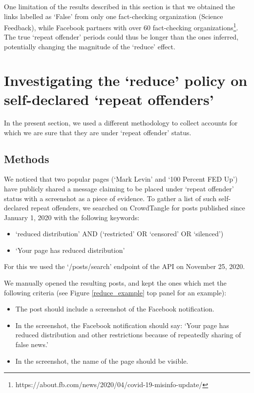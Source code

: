 \documentclass[11pt,a4paper]{article}
\begin{document}
One limitation of the results described in this section is that we obtained the links labelled as `False' from only one fact-checking organization (Science Feedback), while Facebook partners with over 60 fact-checking organizations\footnote{https://about.fb.com/news/2020/04/covid-19-misinfo-update/}.
The true `repeat offender' periods could thus be longer than the ones inferred, potentially changing the magnitude of the ‘reduce’ effect.

\section{Investigating the `reduce' policy on self-declared `repeat offenders'}

In the present section, we used a different methodology to collect accounts for which we are sure that they are under `repeat offender' status. 

\subsection{Methods}

We noticed that two popular pages (`Mark Levin' and `100 Percent FED Up') have publicly shared a message claiming to be placed under `repeat offender' status with a screenshot as a piece of evidence.
To gather a list of such self-declared repeat offenders, we searched on CrowdTangle for posts published since January 1, 2020 with the following keywords:
\begin{itemize}
\item `reduced distribution' AND (`restricted' OR `censored' OR `silenced')
\item `Your page has reduced distribution'
\end{itemize}
For this we used the `/posts/search' endpoint of the API on November 25, 2020. 

We manually opened the resulting posts, and kept the ones which met the following criteria (see Figure \ref{reduce_example} top panel for an example):
\begin{itemize}
\item The post should include a screenshot of the Facebook notification.
\item In the screenshot, the Facebook notification should say: `Your page has reduced distribution and other restrictions because of repeatedly sharing of false news.'
\item In the screenshot, the name of the page should be visible.
\end{itemize}
\end{document}
